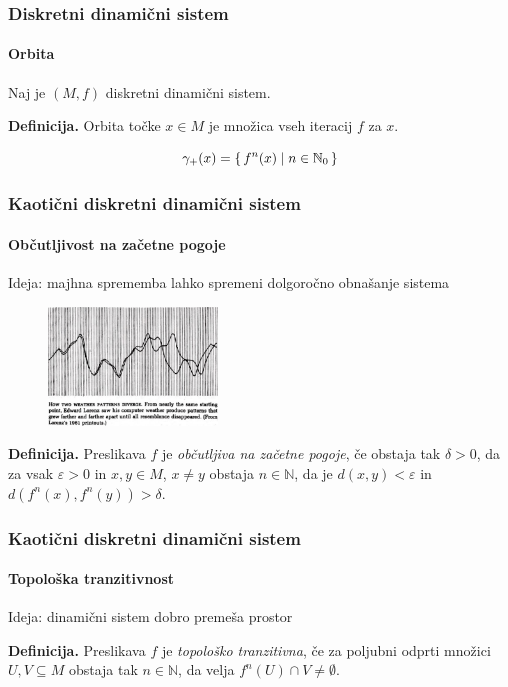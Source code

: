 \documentclass[12pt]{beamer}
\newcommand{\N}{\mathbb N}
\begin{document}
\begin{frame}
\frametitle{Diskretni dinamični sistem}
\framesubtitle{Orbita}
Naj je $(M, f)$ diskretni dinamični sistem.

\bigskip

\textbf{Definicija.}
Orbita točke $x \in M$ je množica vseh iteracij $f$ za $x$.

$$ \gamma_{+}(x) = \set{ f^n(x) \mid n \in \N_0 } $$

\end{frame}


\begin{frame}
\frametitle{Kaotični diskretni dinamični sistem}
\framesubtitle{Občutljivost na začetne pogoje}

Ideja: majhna sprememba lahko spremeni dolgoročno obnašanje sistema

\begin{figure}
    \centering
    \includegraphics[width=0.4\textwidth]{lorenz_vreme.png}
\end{figure}

\bigskip

\textbf{Definicija.}
Preslikava $f$ je \emph{občutljiva na začetne pogoje}, če obstaja tak $\delta > 0$, da za vsak $\varepsilon > 0$ in $x,y \in M$, $x \neq y$ obstaja $n \in \N$, da je $d(x, y) < \varepsilon$ in $d(f^{n}(x), f^{n}(y)) > \delta$.

\end{frame}


\begin{frame}
\frametitle{Kaotični diskretni dinamični sistem}
\framesubtitle{Topološka tranzitivnost}
Ideja: dinamični sistem dobro premeša prostor

\bigskip

\textbf{Definicija.}
Preslikava $f$ je \emph{topološko tranzitivna}, če za poljubni odprti množici $U, V \subseteq M$ obstaja tak $n \in \N$, da velja $f^{n}(U) \cap V \neq \emptyset$.

\end{frame}
\end{document}
